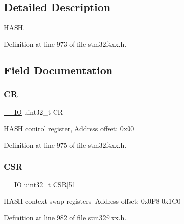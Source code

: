 \subsection{Detailed Description}
H\+A\+SH. 

Definition at line 973 of file stm32f4xx.\+h.



\subsection{Field Documentation}
\mbox{\label{struct_h_a_s_h___type_def_ab40c89c59391aaa9d9a8ec011dd0907a}} 
\subsubsection{\texorpdfstring{CR}{CR}}
{\footnotesize\ttfamily \hyperlink{group___c_m_s_i_s__core__definitions_gaec43007d9998a0a0e01faede4133d6be}{\+\_\+\+\_\+\+IO} uint32\+\_\+t CR}

H\+A\+SH control register, Address offset\+: 0x00 

Definition at line 975 of file stm32f4xx.\+h.

\mbox{\label{struct_h_a_s_h___type_def_a5a72a62805d5497f2b44448edd18f20f}} 
\subsubsection{\texorpdfstring{C\+SR}{CSR}}
{\footnotesize\ttfamily \hyperlink{group___c_m_s_i_s__core__definitions_gaec43007d9998a0a0e01faede4133d6be}{\+\_\+\+\_\+\+IO} uint32\+\_\+t C\+SR\mbox{[}51\mbox{]}}

H\+A\+SH context swap registers, Address offset\+: 0x0\+F8-\/0x1\+C0 

Definition at line 982 of file stm32f4xx.\+h.

\mbox{\label{struct_h_a_s_h___type_def_a445dd5529e7dc6a4fa2fec4f78da2692}} 
